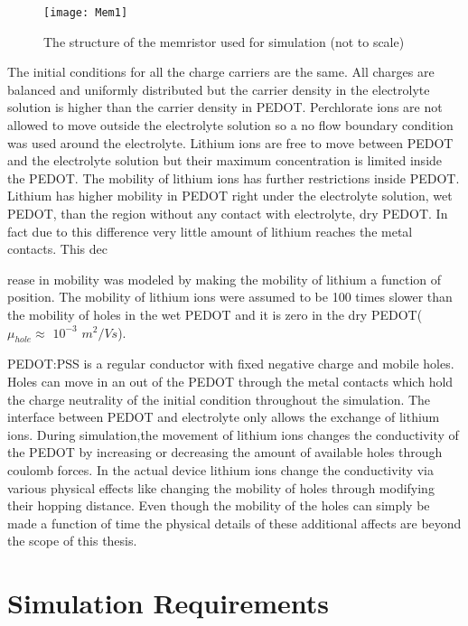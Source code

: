 \begin{figure}[!htp]
\centering
\texttt{[image: Mem1]}
\caption{The structure of the memristor used for simulation (not to scale)} 
\label{MemStc}
\end{figure}

The initial conditions for all the charge carriers are the same. All charges are balanced and uniformly distributed but the carrier density in the electrolyte solution is higher than the carrier density in PEDOT. Perchlorate ions are not allowed to move outside the electrolyte solution so a no flow boundary condition was used around the electrolyte. Lithium ions are free to move between PEDOT and the electrolyte solution but their maximum concentration is limited inside the PEDOT. The mobility of lithium ions has further restrictions inside PEDOT. Lithium has higher mobility in PEDOT right under the electrolyte solution, wet PEDOT, than the region without any contact with electrolyte, dry PEDOT. In fact due to this difference very little amount of lithium reaches the metal contacts. This dec{rease in mobility was modeled by making the mobility of lithium a function of position. The mobility of lithium ions were assumed to be 100 times slower than the mobility of holes in the wet PEDOT and it is zero in the dry PEDOT( $\mu_{hole} \approx$ $10^{-3}$ $m^2/Vs$).  

PEDOT:PSS is a regular conductor with fixed negative charge and mobile holes. Holes can move in an out of the PEDOT through the metal contacts which hold the charge neutrality of the initial condition throughout the simulation. The interface between PEDOT and electrolyte only allows the exchange of lithium ions. During simulation,the movement of lithium ions changes the conductivity of the PEDOT by increasing or decreasing the amount of available holes through coulomb forces. In the actual device lithium ions change the conductivity via various physical effects like changing the mobility of holes through modifying their hopping distance. Even though the mobility of the holes can simply be made a function of time the physical details of these additional affects are beyond the scope of this thesis. 


\clearpage
\section{Simulation Requirements}

}

